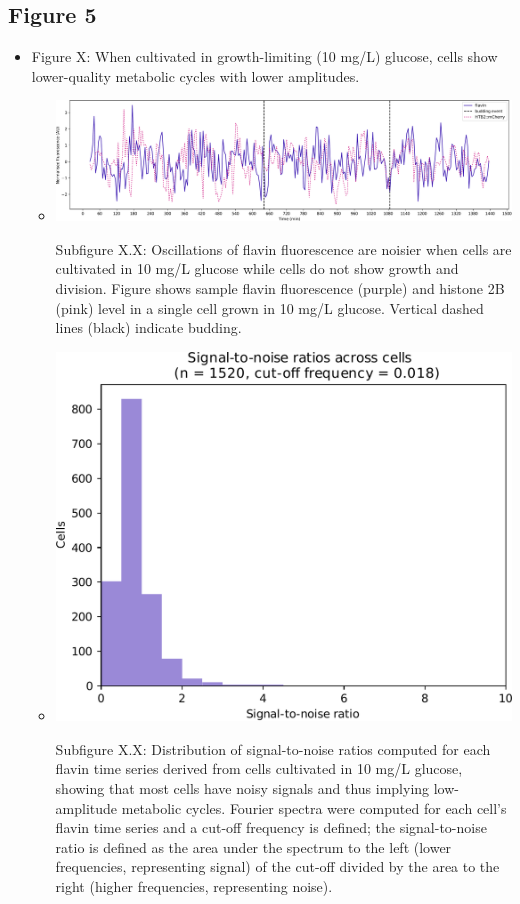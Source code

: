 \subsection{Figure 5}
\label{sec:org16a2ef0}
\begin{itemize}
\item Figure X: When cultivated in growth-limiting (10 mg/L) glucose, cells show lower-quality metabolic cycles with lower amplitudes.

\begin{itemize}
\item \begin{center}
\includegraphics[width=.9\linewidth]{limiting_single_birth_plot_edit.pdf}
\end{center} Subfigure X.X: Oscillations of flavin fluorescence are noisier when cells are cultivated in 10 mg/L glucose while cells do not show growth and division.  Figure shows sample flavin fluorescence (purple) and histone 2B (pink) level in a single cell grown in 10 mg/L glucose.  Vertical dashed lines (black) indicate budding.
\item \begin{center}
\includegraphics[width=.9\linewidth]{limiting_snr_edit.pdf}
\end{center} Subfigure X.X: Distribution of signal-to-noise ratios computed for each flavin time series derived from cells cultivated in 10 mg/L glucose, showing that most cells have noisy signals and thus implying low-amplitude metabolic cycles.  Fourier spectra were computed for each cell's flavin time series and a cut-off frequency is defined; the signal-to-noise ratio is defined as the area under the spectrum to the left (lower frequencies, representing signal) of the cut-off divided by the area to the right (higher frequencies, representing noise).

\end{itemize}
\end{itemize}
